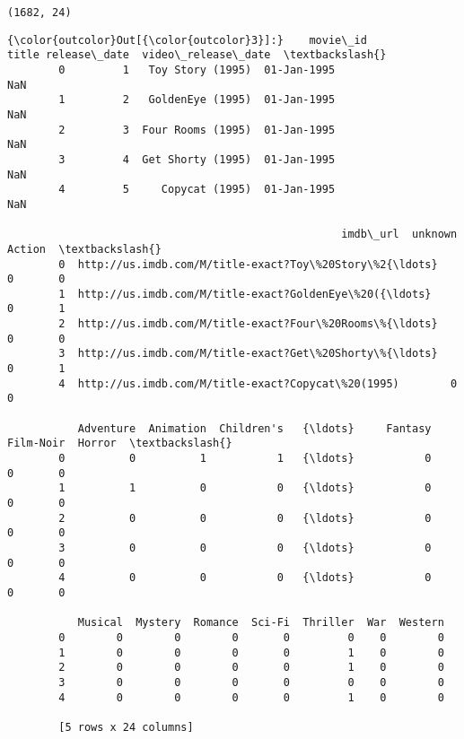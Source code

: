 \documentclass[11pt]{article}
\begin{document}
    \begin{Verbatim}[commandchars=\\\{\}]
(1682, 24)

    \end{Verbatim}

\begin{Verbatim}[commandchars=\\\{\}]
{\color{outcolor}Out[{\color{outcolor}3}]:}    movie\_id              title release\_date  video\_release\_date  \textbackslash{}
        0         1   Toy Story (1995)  01-Jan-1995                 NaN   
        1         2   GoldenEye (1995)  01-Jan-1995                 NaN   
        2         3  Four Rooms (1995)  01-Jan-1995                 NaN   
        3         4  Get Shorty (1995)  01-Jan-1995                 NaN   
        4         5     Copycat (1995)  01-Jan-1995                 NaN   
        
                                                    imdb\_url  unknown  Action  \textbackslash{}
        0  http://us.imdb.com/M/title-exact?Toy\%20Story\%2{\ldots}        0       0   
        1  http://us.imdb.com/M/title-exact?GoldenEye\%20({\ldots}        0       1   
        2  http://us.imdb.com/M/title-exact?Four\%20Rooms\%{\ldots}        0       0   
        3  http://us.imdb.com/M/title-exact?Get\%20Shorty\%{\ldots}        0       1   
        4  http://us.imdb.com/M/title-exact?Copycat\%20(1995)        0       0   
        
           Adventure  Animation  Children's   {\ldots}     Fantasy  Film-Noir  Horror  \textbackslash{}
        0          0          1           1   {\ldots}           0          0       0   
        1          1          0           0   {\ldots}           0          0       0   
        2          0          0           0   {\ldots}           0          0       0   
        3          0          0           0   {\ldots}           0          0       0   
        4          0          0           0   {\ldots}           0          0       0   
        
           Musical  Mystery  Romance  Sci-Fi  Thriller  War  Western  
        0        0        0        0       0         0    0        0  
        1        0        0        0       0         1    0        0  
        2        0        0        0       0         1    0        0  
        3        0        0        0       0         0    0        0  
        4        0        0        0       0         1    0        0  
        
        [5 rows x 24 columns]
\end{Verbatim}
            
\end{document}
